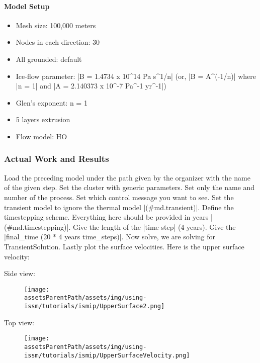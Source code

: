 \paragraph{Model Setup}
\begin{itemize}
	\item Mesh size: 100,000 meters
	\item Nodes in each direction: 30
	\item All grounded: default
	\item Ice-flow parameter: \lstinlinebg|B = 1.4734 x 10^14 Pa s^1/n| (or, \lstinlinebg|B = A^(-1/n)| where \lstinlinebg|n = 1| and \lstinlinebg|A = 2.140373 x 10^-7 Pa^-1 yr^-1|)
	\item Glen's exponent: n = 1
	\item 5 layers extrusion
	\item Flow model: HO
\end{itemize}

\subsubsection{Actual Work and Results} %
Load the preceding model under the path given by the organizer with the name of the given step. Set the cluster with generic parameters. Set only the name and number of the process. Set which control message you want to see. Set the transient model to ignore the thermal model \lstinlinebg|(#md.transient)|. Define the timestepping scheme. Everything here should be provided in years \lstinlinebg|(#md.timestepping)|. Give the length of the \lstinlinebg|time step| (4 years). Give the \lstinlinebg|final_time (20 * 4 years time_steps)|. Now solve, we are solving for TransientSolution. Lastly plot the surface velocities. Here is the upper surface velocity:

Side view:
\begin{figure}[H]
	\begin{center}
		\texttt{[image: \\assetsParentPath/assets/img/using-issm/tutorials/ismip/UpperSurface2.png]}
	\end{center}
\end{figure}
Top view:
\begin{figure}[H]
	\begin{center}
		\texttt{[image: \\assetsParentPath/assets/img/using-issm/tutorials/ismip/UpperSurfaceVelocity.png]}
	\end{center}
\end{figure}
